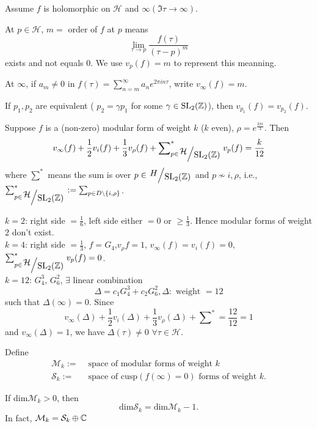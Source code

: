 Assume  $f$ is holomorphic on $\mathcal{H}$ and $\infty(\Im\tau\to \infty)$. 

At $p\in \mathcal{H}$, $m=$ order of $f$ at $p$ means
\[
  \lim_{\tau\to p}\frac{f(\tau)}{(\tau-p)^{m}}
\] 
exists and not equals $0$. We use $v_{p}(f)=m$ to represent this meanning.

At $\infty$, if $a_m\neq 0$ in $f(\tau)=\sum_{n=m}^{\infty} a_ne^{2\pi in\tau}$, write $v_{\infty}(f)=m$.

If $p_1,p_2$ are equivalent ( $p_2=\gamma p_1$ for some $\gamma \in \operatorname{SL}_2(\mathbb{Z})$), then $v_{p_1}(f)=v_{p_2}(f)$.

\begin{theorem}\label{thm2-5}
  Suppose $f$ is a (non-zero) modular form of weight $k$ ($k$ even),  $\rho = e^{ \frac{2\pi i}{3}}$. Then 
  \begin{equation}\label{2-2}
    v_{\infty}(f)+\frac{1}{2}v_i(f)+\frac{1}{3}v_\rho (f)+\sum_{p \in \sfrac{\mathcal{H}}{\SL}}\nolimits^{*} v_p(f)=\frac{k}{12}
  \end{equation} 
  where $\sum^{*} $ means the sum is over $p \in \sfrac{H}{\SL}$ and $p\not\sim i,\rho$, i.e., $\sum_{p\in \sfrac{\mathcal{H}}{\SL}}^{*}:=\sum_{p\in D\backslash \{i,\rho\} }$.
\end{theorem}
 $k=2$: right side $=\frac{1}{6}$, left side either $=0$ or $\ge \frac{1}{3}$. Hence modular forms of weight $2$ don't exist.\\
 $k=4$: right side  $=\frac{1}{3}$, $f=G_4$,$v_\rho f=1$,  $v_{\infty}(f)=v_i(f)=0$, $\sum_{p \in \sfrac{\mathcal{H}}{\SL}}^{*} v_p(f)=0$.\\
 $k=12$:  $G_4^3$, $G_6^2$, $\exists $ linear combination
 \[
 \Delta=c_1G_4^3+c_2G_6^2, \Delta:\text{ weight }=12
 \] 
 such that $\Delta(\infty)=0$. Since 
 \[
   v_{\infty}(\Delta)+\frac{1}{2}v_i(\Delta)+\frac{1}{3}v_\rho(\Delta)+\sum\nolimits^{*}=\frac{12}{12}=1
 \]
 and $v_{\infty}(\Delta)=1$, we have $\Delta(\tau)\neq 0$ $\forall \tau \in \mathcal{H}$.

 \begin{definition}
   Define
   \begin{align*}
     \mathcal{M}_k:=&\text{ space of modular forms of weight }k\\
     \mathcal{S}_k:=&\text{ space of cusp}\left( f(\infty)=0 \right) \text{ forms of weight }k
   .\end{align*}
 \end{definition}

 If $\mathrm{dim}\mathcal{M}_k>0$, then
\[
\mathrm{dim}\mathcal{S}_k=\mathrm{dim}\mathcal{M}_k-1.
\]
In fact, $\mathcal{M}_k=\mathcal{S}_k\oplus \mathbb{C}$

